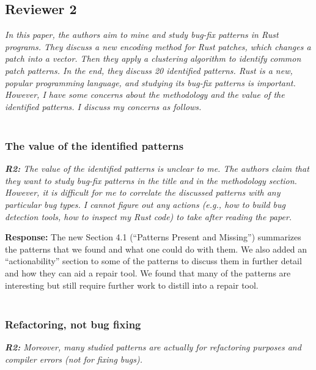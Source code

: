 \documentclass{article}
\begin{document}
\subsection{Reviewer 2}

\textit{In this paper, the authors aim to mine and study bug-fix patterns in Rust programs. They discuss a new encoding method for Rust patches, which changes a patch into a vector. Then they apply a clustering algorithm to identify common patch patterns. In the end, they discuss 20 identified patterns.
Rust is a new, popular programming language, and studying its bug-fix patterns is important. However, I have some concerns about the methodology and the value of the identified patterns. I discuss my concerns as follows.} \\ \\

\subsubsection{\label{rev:2:value}The value of the identified patterns}

\textit{\textbf{R2:} The value of the identified patterns is unclear to me. The authors claim that they want to study bug-fix patterns in the title and in the methodology section. However, it is difficult for me to correlate the discussed patterns with any particular bug types. I cannot figure out any actions (e.g., how to build bug detection tools, how to inspect my Rust code) to take after reading the paper.}

\vspace*{1em} \noindent \textbf{Response:} The new Section 4.1 (“Patterns Present and Missing”) summarizes the patterns that we found and what one could do with them. We also added an “actionability” section to some of the patterns to discuss them in further detail and how they can aid a repair tool. We found that many of the patterns are interesting but still require further work to distill into a repair tool. \\ \\

\subsubsection{\label{rev:2:refactoring}Refactoring, not bug fixing}

\textit{\textbf{R2:} Moreover, many studied patterns are actually for refactoring purposes and compiler errors (not for fixing bugs).}
\end{document}
